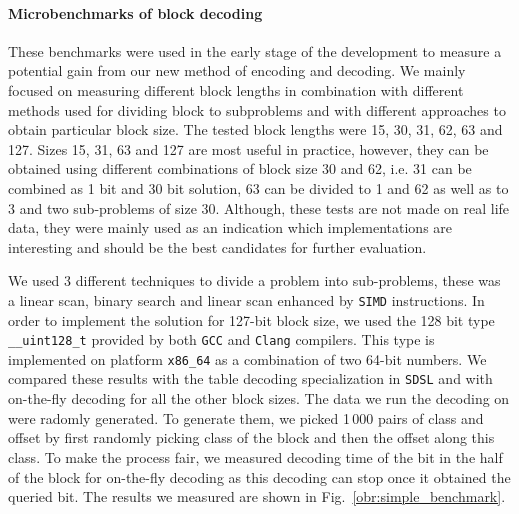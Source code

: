 \paragraph{Microbenchmarks of block decoding}

These benchmarks were used in the early stage of the development to measure a potential gain from
our new method of encoding and decoding. We mainly focused on measuring different block lengths
in combination with different methods used for dividing block to subproblems and with different
approaches to obtain particular block size. The tested block lengths were 15, 30, 31, 62, 63
and 127. Sizes 15, 31, 63 and 127 are most useful in practice, however, they can be obtained using
different combinations of block size 30 and 62, i.e. 31 can be combined as 1 bit and 30 bit solution,
63 can be divided to 1 and 62 as well as to 3 and two sub-problems of size 30. Although, these
tests are not made on real life data, they were mainly used as an indication which implementations
are interesting and should be the best candidates for further evaluation.

We used 3 different techniques to divide a problem into sub-problems, these was a linear scan,
binary search and linear scan enhanced by \texttt{SIMD} instructions. In order to implement the
solution for 127-bit block size, we used the 128 bit type \texttt{\_\_uint128\_t} provided by both
\texttt{GCC} and \texttt{Clang} compilers. This type is implemented on platform \texttt{x86\_64}
as a combination of two 64-bit numbers. We compared these results with the table decoding specialization
in \texttt{SDSL} and with on-the-fly decoding for all the other block sizes. The data we run the decoding
on were radomly generated. To generate them, we picked 1\,000 pairs of class and offset by first randomly
picking class of the block and then the offset along this class. To make the process fair, we measured
decoding time of the bit in the half of the block for on-the-fly decoding as this decoding can stop once
it obtained the queried bit. The results we measured are shown in Fig.~\ref{obr:simple_benchmark}.


